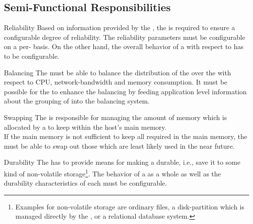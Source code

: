 \documentclass[a4paper, 12pt]{book}
\begin{document}
\subsection{Semi-Functional Responsibilities}


\begin{responsibility*}{Reliability}
  \label{resp:reliability}
  Based on information provided by the , the
  \SYNEIGHT is required to ensure a configurable degree of reliability.
  The reliability parameters must be configurable on a per-
  basis. On the other hand, the overall behavior of a  with respect to  has to be configurable.
\end{responsibility*}

\begin{responsibility*}{Balancing}
  \label{resp:balancing}
  The \SYNEIGHT must be able to balance the distribution of the
   over the  with respect to CPU,
  network-bandwidth and memory consumption. It must be possible for the
   to enhance the balancing by feeding application level
  information about the grouping of  into the balancing system.
\end{responsibility*}

\begin{responsibility*}{Swapping}
  \label{resp:swapping}
  The \SYNEIGHT is responsible for managing the amount of memory which
  is allocated by a  to keep  within
  the host's  main memory.\\
  If the main memory is not sufficient to keep all required  in
  the main memory, the \SYNEIGHT must be able to swap out those
   which are least likely used in the near future. 
\end{responsibility*}


\begin{responsibility*}{Durability}
  \label{resp:durability}
  The \SYNEIGHT has to provide means for making a  durable,
  i.e., save it to some kind of non-volatile storage\footnote{Examples for
    non-volatile storage are ordinary files, a disk-partition which is managed
    directly by the \SYNEIGHT, or a relational database system.}. The
  behavior of a  as a whole as well as the
  durability characteristics of each  must be configurable.
\end{responsibility*}
\end{document}
